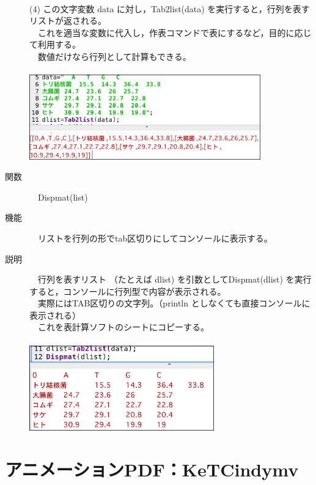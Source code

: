 \documentclass[papersize,a4paper,12pt,uplatex]{jsarticle}
\begin{document}
\begin{description}
　\\
(4) この文字変数 data に対し，Tab2list(data) を実行すると，行列を表すリストが返される。\\
　これを適当な変数に代入し，作表コマンドで表にするなど，目的に応じて利用する。\\
　数値だけなら行列として計算もできる。\\
　\\
\includegraphics[bb=0 0 1245 457 , width=10cm]{Fig/tab2list03.png}

\hypertarget{dispmat}{}
\item[関数]　Dispmat(list)
\item[機能]　リストを行列の形でtab区切りにしてコンソールに表示する。
\item[説明]　行列を表すリスト （たとえば dlist) を引数としてDispmat(dlist) を実行すると，コンソールに行列型で内容が表示される。\\
　実際にはTAB区切りの文字列。（println としなくても直接コンソールに表示される）\\
　これを表計算ソフトのシートにコピーする。\\
　\\
\includegraphics[bb=0 0 855 395 , width=8cm]{Fig/tab2list04.png}\

\end{description}
\newpage

\section{アニメーションPDF：KeTCindymv}
\end{document}
